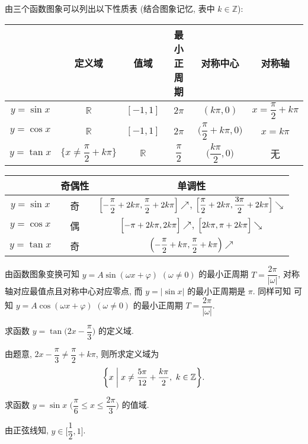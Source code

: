 由三个函数图象可以列出以下性质表 (结合图象记忆, 表中 $k\in\mathbb{Z}$):
{\extrarowheight=7pt\small
\begin{center}
    \begin{tabular}{cccccc}
        & 定义域 & 值域 & 最小正周期 & 对称中心 & 对称轴 \\
       \hline
      $y=\sin x$ & $\mathbb{R}$ & $[-1,1]$ & $2\pi$ & 
        $(k\pi,0)$ & $x=\dfrac{\pi}2+k\pi$\\
      $y=\cos x$ & $\mathbb{R}$ & $[-1,1]$ & $2\pi$ & 
        $\Big(\dfrac{\pi}2+k\pi,0\Big)$ & $x=k\pi$ \\
      $y=\tan x$ & $\Big\{x\neq\dfrac{\pi}2+k\pi\Big\}$ & $\mathbb{R}$ &
        $\dfrac{\pi}2$ & $\Big(\dfrac{k\pi}2,0\Big)$ & 无
    \end{tabular}
\end{center}
\begin{center}
    \begin{tabular}{ccc}
           & 奇偶性 & 单调性 \\
       \hline
      $y=\sin x$ & 奇 &
        $\Bigl[-\dfrac{\pi}2+2k\pi,\dfrac{\pi}2+2k\pi\Bigr]\nearrow$,
        $\Bigl[\dfrac{\pi}2+2k\pi,\dfrac{3\pi}2+2k\pi\Bigr]\searrow$   \\
      $y=\cos x$ & 偶 & 
        $\Bigl[-\pi+2k\pi,2k\pi\Bigr]\nearrow$, 
        $\Bigl[2k\pi,\pi+2k\pi\Bigr]\searrow$                \\
      $y=\tan x$ & 奇 & 
        $\Bigl(-\dfrac{\pi}2+k\pi,\dfrac{\pi}2+k\pi\Bigr)\nearrow$
    \end{tabular}
\end{center}}

由函数图象变换可知 $y= A\sin(\omega x+ \varphi)$ $(\omega\neq 0)$ 的最小正周期 $T= \dfrac{2\pi}{|\omega|}$, 对称轴对应最值点且对称中心对应零点, 而 $y= |\sin x|$ 的最小正周期是 $\pi$. 同样可知 可知 $y= A\cos(\omega x+ \varphi)$ $(\omega\neq 0)$ 的最小正周期 $T= \dfrac{2\pi}{|\omega|}$.

\lianxi
\begin{exercise}
    求函数 $y=\tan\Big(2x-\dfrac\pi3\Big)$ 的定义域.
\end{exercise}
\beginsolution
    由题意, $2x-\dfrac\pi3\neq \dfrac\pi2+k\pi$, 则所求定义域为
    \[\biggl\{x\biggm| x\neq \frac{5\pi}{12}+ \frac{k\pi}{2},\ 
        k\in\mathbb{Z}\biggr\}.\]
\endsolution

\begin{exercise}
    求函数 $y=\sin x$ $\Big(\dfrac\pi6\leqslant x\leqslant 
      \dfrac{2\pi}3\Big)$ 的值域.
\end{exercise}
\beginsolution
    由正弦线知, $y\in\biggl[\dfrac12,1\biggr]$.
\endsolution

